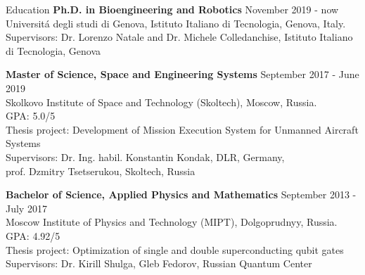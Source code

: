 \documentclass{resume} %
\begin{document}



\begin{rSection}{Education}
{\bf Ph.D. in Bioengineering and Robotics} \hfill {November 2019 - now}
\\ 
Universit\'a degli studi di Genova, Istituto Italiano di Tecnologia, Genova, Italy.
\\
{Supervisors: Dr. Lorenzo Natale and Dr. Michele Colledanchise, Istituto Italiano di Tecnologia, Genova}


{\bf Master of Science, Space and Engineering Systems} \hfill {September 2017 - June 2019}
\\ 
Skolkovo Institute of Space and Technology (Skoltech), Moscow, Russia.
\\
GPA: 5.0/5
\\
{Thesis project: Development of Mission Execution System for Unmanned Aircraft Systems}
\\
{Supervisors: Dr. Ing. habil. Konstantin Kondak, DLR, Germany,\\} 
{prof. Dzmitry Tsetserukou, Skoltech, Russia}

{\bf Bachelor of Science, Applied Physics and Mathematics} \hfill {September 2013 - July 2017}
\\ 
Moscow Institute of Physics and Technology (MIPT), Dolgoprudnyy, Russia.
\\
GPA: 4.92/5
\\
Thesis project: Optimization of single and double superconducting qubit gates 
\\
Supervisors: Dr. Kirill Shulga, Gleb Fedorov, Russian Quantum Center



\end{rSection}
\end{document}
